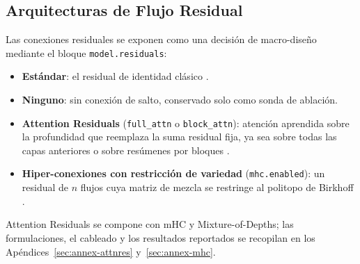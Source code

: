\subsection{Arquitecturas de Flujo Residual}
\label{sec:residual-stream}

Las conexiones residuales se exponen como una decisión de macro-diseño mediante el bloque \texttt{model.residuals}:
\begin{itemize}[leftmargin=*]
    \item \textbf{Estándar}: el residual de identidad clásico \citep{he_deep_2016}.
    \item \textbf{Ninguno}: sin conexión de salto, conservado solo como sonda de ablación.
    \item \textbf{Attention Residuals} (\texttt{full\_attn} o \texttt{block\_attn}): atención aprendida sobre la profundidad que reemplaza la suma residual fija, ya sea sobre todas las capas anteriores o sobre resúmenes por bloques \citep{sun_attnres_2026}.
    \item \textbf{Hiper-conexiones con restricción de variedad} (\texttt{mhc.enabled}): un residual de $n$ flujos cuya matriz de mezcla se restringe al politopo de Birkhoff \citep{xie_mhc_2025}.
\end{itemize}

Attention Residuals se compone con mHC y Mixture-of-Depths; las formulaciones, el cableado y los resultados reportados se recopilan en los Apéndices~\ref{sec:annex-attnres} y~\ref{sec:annex-mhc}.
